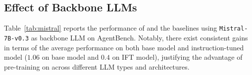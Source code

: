 \subsection{Effect of Backbone LLMs}


Table~\ref{tab:mistral} reports the performance of \method and the baselines using \texttt{Mistral-7B-v0.3} as backbone LLM on AgentBench. 
Notably, there exist consistent gains in terms of the average performance on both base model and instruction-tuned model ($1.06$ on base model and $0.4$ on IFT model), justifying the advantage of pre-training on \dataset across different LLM types and architectures.


